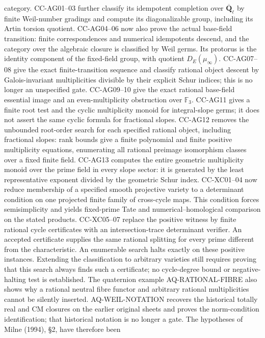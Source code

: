 \begin{description}[style=nextline,leftmargin=0pt]
category. CC-AG01--03 further classify its idempotent completion over
$\overline{\mathbf Q}_\ell$ by finite Weil-number gradings and
compute its diagonalizable group, including its Artin torsion quotient. CC-AG04--06 now also prove the
actual base-field transition: finite correspondences and numerical
idempotents descend, and the category over the algebraic closure is
classified by Weil germs. Its protorus is the identity component of
the fixed-field group, with quotient $D_E(\mu_\infty)$.
CC-AG07--08 give the exact finite-transition sequence and classify
rational object descent by Galois-invariant multiplicities divisible
by their explicit Schur indices; this is no longer an unspecified gate.
CC-AG09--10 give the exact rational base-field essential image and an
even-multiplicity obstruction over $\mathbb F_3$. CC-AG11 gives a
finite root test and the cyclic multiplicity monoid for integral-slope
germs; it does not assert the same cyclic formula for fractional slopes.
CC-AG12 removes the unbounded root-order search for each specified
rational object, including fractional slopes: rank bounds give a finite
polynomial and finite positive multiplicity equations, enumerating all
rational preimage isomorphism classes over a fixed finite field.
CC-AG13 computes the entire geometric multiplicity monoid over the
prime field in every slope sector: it is generated by the least
representative exponent divided by the geometric Schur index.
CC-XC01--04 now reduce membership of a specified smooth projective
variety to a determinant condition on one projected finite family
of cross-cycle maps. This condition forces semisimplicity and yields
fixed-prime Tate and numerical--homological comparison on the stated
products. CC-XC05--07 replace the positive witness by finite rational
cycle certificates with an intersection-trace determinant verifier.
An accepted certificate supplies the same rational splitting for
every prime different from the characteristic. An enumerable search
halts exactly on these positive instances. Extending the classification
to arbitrary varieties still requires proving that this search always
finds such a certificate; no cycle-degree bound or negative-halting
test is established. The
quaternion example AQ-RATIONAL-FIBRE also shows why a rational neutral
fibre functor and arbitrary rational multiplicities cannot be silently
inserted. AQ-WEIL-NOTATION recovers the historical totally real and CM
closures on the earlier original sheets and proves the norm-condition
identification; that historical notation is no longer a gate.
The hypotheses of Milne (1994), \S2, have therefore been

\end{description}
